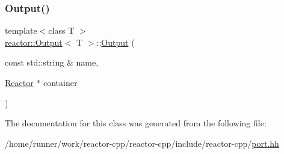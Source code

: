 \subsubsection{\texorpdfstring{Output()}{Output()}}
{\footnotesize\ttfamily template$<$class T $>$ \\
\hyperlink{classreactor_1_1Output}{reactor\+::\+Output}$<$ T $>$\+::\hyperlink{classreactor_1_1Output}{Output} (\begin{DoxyParamCaption}\item[{const std\+::string \&}]{name,  }\item[{\hyperlink{classreactor_1_1Reactor}{Reactor} $\ast$}]{container }\end{DoxyParamCaption})\hspace{0.3cm}{\ttfamily [inline]}}



The documentation for this class was generated from the following file\+:\begin{DoxyCompactItemize}
\item 
/home/runner/work/reactor-\/cpp/reactor-\/cpp/include/reactor-\/cpp/\hyperlink{port_8hh}{port.\+hh}\end{DoxyCompactItemize}

